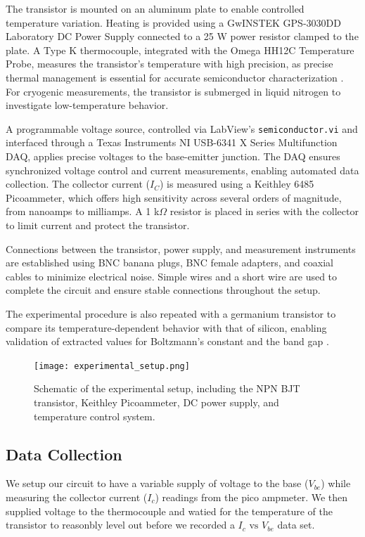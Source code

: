 \documentclass[12pt,letterpaper,twocolumn]{article}
\begin{document}
The transistor is mounted on an aluminum plate to enable controlled temperature variation. Heating is provided using a GwINSTEK GPS-3030DD Laboratory DC Power Supply connected to a 25 W power resistor clamped to the plate. A Type K thermocouple, integrated with the Omega HH12C Temperature Probe, measures the transistor’s temperature with high precision, as precise thermal management is essential for accurate semiconductor characterization \cite{Grundmann}. For cryogenic measurements, the transistor is submerged in liquid nitrogen to investigate low-temperature behavior.

A programmable voltage source, controlled via LabView’s \texttt{semiconductor.vi} and interfaced through a Texas Instruments NI USB-6341 X Series Multifunction DAQ, applies precise voltages to the base-emitter junction. The DAQ ensures synchronized voltage control and current measurements, enabling automated data collection. The collector current (\( I_C \)) is measured using a Keithley 6485 Picoammeter, which offers high sensitivity across several orders of magnitude, from nanoamps to milliamps. A 1 k\(\Omega\) resistor is placed in series with the collector to limit current and protect the transistor.

Connections between the transistor, power supply, and measurement instruments are established using BNC banana plugs, BNC female adapters, and coaxial cables to minimize electrical noise. Simple wires and a short wire are used to complete the circuit and ensure stable connections throughout the setup.

The experimental procedure is also repeated with a germanium transistor to compare its temperature-dependent behavior with that of silicon, enabling validation of extracted values for Boltzmann’s constant and the band gap \cite{Collings}.

\begin{figure}[H]
\centering
\texttt{[image: experimental\_setup.png]}
\caption{Schematic of the experimental setup, including the NPN BJT transistor, Keithley Picoammeter, DC power supply, and temperature control system.}
\label{fig:apparatus}
\end{figure}



\subsection{Data Collection}
We setup our circuit to have a variable supply of voltage to the base ($V_{be}$) while measuring the collector current ($I_c$) readings from the pico ampmeter.
We then supplied voltage to the thermocouple and watied for the temperature of the transistor to reasonbly level out before we recorded a $I_c \text{ vs } V_{be}$ data set.
\end{document}
